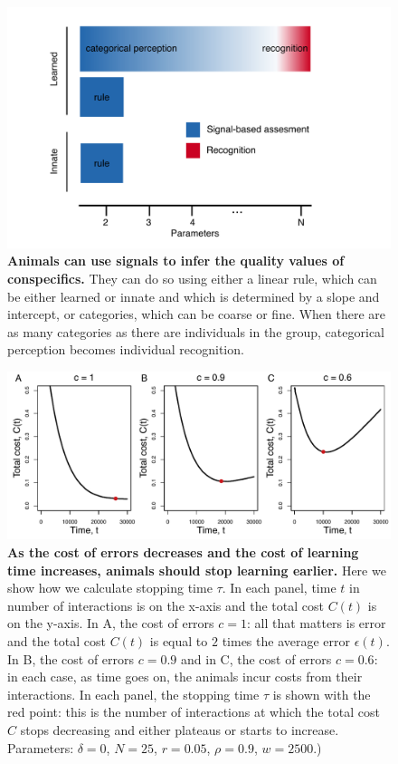 \begin{figure}
\includegraphics[width=6.85in]{figures/schematic_cropped.png}
\caption{\sffamily\small\textbf{Animals can use signals to infer the quality values of conspecifics.} They can do so using either a linear rule, which can be either learned or innate and which is determined by a slope and intercept, or categories, which can be coarse or fine. When there are as many categories as there are individuals in the group, categorical perception becomes individual recognition.}
\label{schematic}
\end{figure}

\begin{figure}[ht]
\includegraphics[width=6.85in]{figures/stopping_time.pdf}
\caption{\sffamily\small\textbf{As the cost of errors decreases and the cost of learning time increases, animals should stop learning earlier.} Here we show how we calculate stopping time $\tau$. In each panel, time $t$ in number of interactions  is on the x-axis and the total cost $C(t)$ is on the y-axis. In A, the cost of errors $c=1$: all that matters is error and the total cost $C(t)$ is equal to $2$ times the average error $\epsilon(t)$. In B, the cost of errors $c=0.9$ and in C, the cost of errors $c=0.6$: in each case, as time goes on, the animals incur costs from their interactions. In each panel, the stopping time $\tau$ is shown with the red point: this is the number of interactions at which the total cost $C$ stops decreasing and either plateaus or starts to increase. Parameters: $\delta=0$, $N=25$, $r=0.05$, $\rho=0.9$, $w=2500$.)
}
\label{tau}
\end{figure}


